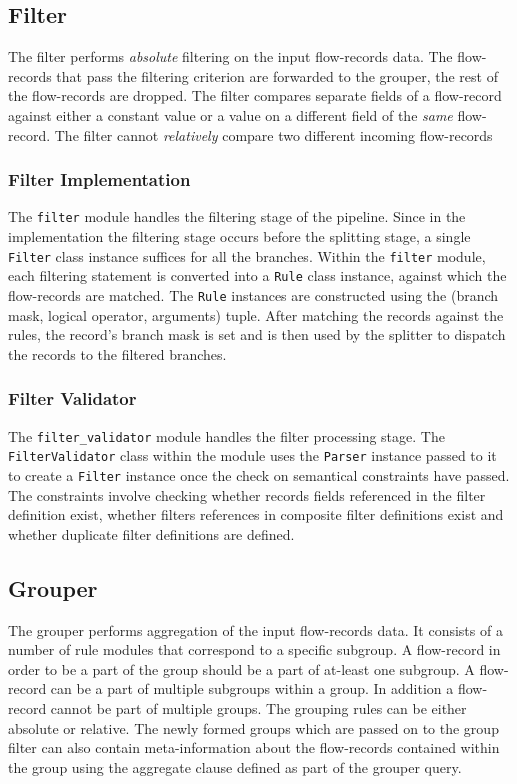 \subsection{Filter}\label{subsec:filter}
The filter performs \emph{absolute} filtering on the input flow-records data. The flow-records that pass the filtering criterion are forwarded to the grouper, the rest of the flow-records are dropped. The filter compares separate fields of a flow-record against either a constant value or a value on a different field of the \emph{same} flow-record. The filter cannot \emph{relatively} compare two different incoming flow-records

\subsubsection{Filter Implementation}\label{subsubsec:filter-impl}
The \texttt{filter} module handles the filtering stage of the pipeline. Since in the implementation the filtering stage occurs before the splitting stage, a single \texttt{Filter} class instance suffices for all the branches. Within the \texttt{filter} module, each filtering statement is converted into a \texttt{Rule} class instance, against which the flow-records are matched. The \texttt{Rule} instances are constructed using the (branch mask, logical operator, arguments) tuple. After matching the records against the rules, the record's branch mask is set and is then used by the splitter to dispatch the records to the filtered branches.

\subsubsection{Filter Validator}\label{subsubsec:filter-validator}
The \texttt{filter\_validator} module handles the filter processing stage. The \texttt{FilterValidator} class within the module uses the \texttt{Parser} instance passed to it to create a \texttt{Filter} instance once the check on semantical constraints have passed. The constraints involve checking whether records fields referenced in the filter definition exist, whether filters references in composite filter definitions exist and whether duplicate filter definitions are defined.

\subsection{Grouper}\label{subsec:grouper}
The grouper performs aggregation of the input flow-records data. It consists of a number of rule modules that correspond to a specific subgroup. A flow-record in order to be a part of the group should be a part of at-least one subgroup. A flow-record can be a part of multiple subgroups within a group. In addition a flow-record cannot be part of multiple groups. The grouping rules can be either absolute or relative. The newly formed groups which are passed on to the group filter can also contain meta-information about the flow-records contained within the group using the aggregate clause defined as part of the grouper query.

